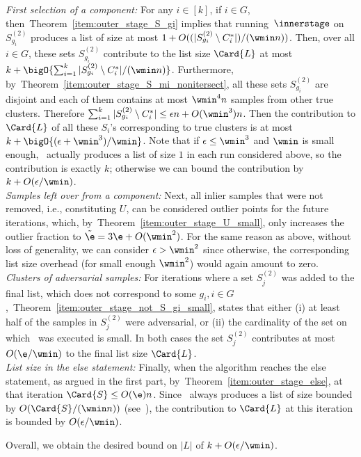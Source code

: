 \emph{First selection of a component:}
    For any \(i \in [k]\), if \(i \in G\), then~Theorem~\ref{item:outer_stage_S_gi} implies that running~\(\innerstage\) on \(S_{g_i}^{(2)}\) produces a list of size at most $1+O((|S_{g_i}^{(2)} \setminus C_i^*|)/(\wmin n))$.
Then, over all $i \in G$, these sets $S_{g_i}^{(2)}$ contribute to the list size $\Card{L}$ at most $k + \bigO{\sum_{i =1}^k |S_{g_i}^{(2)} \setminus C_i^*| / (\wmin n)}$.
Furthermore, by~Theorem~\ref{item:outer_stage_S_mi_nonitersect}, all these sets $S_{g_i}^{(2)}$ are disjoint and each of them contains at most $\wmin^{4}n$ samples from other true clusters.
Therefore $\sum_{i =1}^k |S_{g_i}^{(2)} \setminus C_i^*| \leq \epsilon n + O(\wmin^3) n$.
Then the contribution to $\Card{L}$ of all these \(S_i\)'s corresponding to true clusters is at most $k + \bigO{(\epsilon + \wmin^3)/\wmin}$.
Note that if $\epsilon \leq \wmin^3$ and $\wmin$ is small enough,~ actually produces a list of size $1$ in each run considered above, so the contribution is exactly $k$; otherwise we can bound the contribution by $k+O(\epsilon/\wmin)$. \\

\emph{Samples left over from a component:}
Next, all inlier samples that were not removed, i.e., constituting \(U\), can be considered outlier points for the future iterations, which, by~Theorem~\ref{item:outer_stage_U_small},  only increases the outlier fraction to \(\tilde \e = 3\e + O(\wmin^2)\).
For the same reason as above, without loss of generality, we can consider $\epsilon > \wmin^2$ since otherwise, the corresponding list size overhead (for small enough $\wmin^2$) would again amount to zero.\\

\emph{Clusters of adversarial samples:}
For iterations where a set \(S_j^{(2)}\) was added to the final list, which does not correspond to some \(g_i, i \in G\),~Theorem~\ref{item:outer_stage_not_S_gi_small}, states that either (i) at least half of the samples in \(S_j^{(2)}\)  were adversarial, or (ii) the cardinality of the set on which~ was executed
is small. In both cases the set \(S_j^{(2)}\) contributes at most \(O(\e / \wmin)\) to the final list size \(\Card{L}\).\\

\emph{List size in the else statement:}
Finally, when the algorithm reaches the else statement, as argued in the first part, by~Theorem~\ref{item:outer_stage_else}, at that iteration \(\Card{S} \leq O(\e) n\). Since~ always produces a list of size bounded by $O(\Card{S}/(\wmin n))$ (see~), the contribution to $\Card{L}$ at this iteration is bounded by $O(\epsilon/\wmin)$.

Overall, we obtain the desired bound on $|L|$ of $k + O(\epsilon/\wmin)$.
